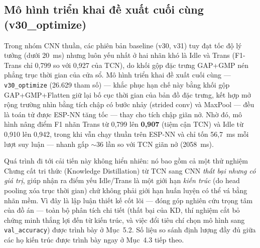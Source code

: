 \documentclass[../DoAn.tex]{subfiles}
\begin{document}
\subsection{Mô hình triển khai đề xuất cuối cùng (v30\_optimize)}
Trong nhóm CNN thuần, các phiên bản baseline (v30, v31) tuy đạt tốc độ lý tưởng (dưới 20~ms) nhưng luôn yếu nhất ở hai nhãn khó là Idle và Trans (F1-Trans chỉ 0,799 so với 0,927 của TCN), do khối gộp đặc trưng GAP+GMP nén phẳng trục thời gian của cửa sổ. Mô hình triển khai đề xuất cuối cùng --- \texttt{v30\_optimize} (26.629 tham số) --- khắc phục hạn chế này bằng khối gộp GAP+GMP+Flatten giữ lại bố cục thời gian của bản đồ đặc trưng, kết hợp mở rộng trường nhìn bằng tích chập có bước nhảy (strided conv) và MaxPool --- đều là toán tử được ESP-NN tăng tốc --- thay cho tích chập giãn nở. Nhờ đó, mô hình nâng điểm F1 nhãn Trans từ 0,799 lên \textbf{0,907} (tiệm cận TCN) và Idle từ 0,910 lên 0,942, trong khi vẫn chạy thuần trên ESP-NN và chỉ tốn 56,7~ms mỗi lượt suy luận --- nhanh gấp $\sim$36 lần so với TCN giãn nở (2058~ms).

Quá trình đi tới cải tiến này không hiển nhiên: nó bao gồm cả một thử nghiệm Chưng cất tri thức (Knowledge Distillation) từ TCN sang CNN \textit{thất bại nhưng có giá trị}, giúp nhận ra điểm yếu Idle/Trans là một giới hạn \textit{kiến trúc} (do head pooling xóa trục thời gian) chứ không phải giới hạn huấn luyện có thể vá bằng nhãn mềm. Vì đây là lập luận thiết kế cốt lõi --- đóng góp nghiên cứu trọng tâm của đồ án --- toàn bộ phân tích chi tiết (thất bại của KD, thí nghiệm cắt bỏ chứng minh thắng lợi đến từ kiến trúc, và việc đổi tiêu chí chọn mô hình sang \texttt{val\_accuracy}) được trình bày ở Mục~5.2. Số liệu so sánh định lượng đầy đủ giữa các họ kiến trúc được trình bày ngay ở Mục~4.3 tiếp theo.
\end{document}
